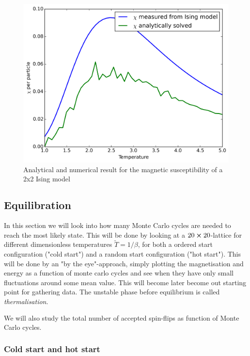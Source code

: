 \documentclass[11pt,a4paper,english,draft]{article}
\numberwithin{equation}{section}
\newcommand{\figurewidth}{.85\textwidth}
\begin{document}
\begin{figure}
\centering
\includegraphics[width=\figurewidth]{pics/pics4report/achi.png}
\caption{Analytical and numerical result for the magnetic susceptibility
of a 2x2 Ising model}
\label{fig:achi}
\end{figure}



\subsection{Equilibration}
In this section we will look into how many Monte Carlo cycles are needed 
to reach the most likely state. This will be done by looking at a 
$20 \cross 20$-lattice for different dimensionless temperatures 
$\tilde{T}=1/\beta$, for both a ordered start configuration ("cold start") 
and a random start configuration ("hot start"). 
This will be done by an "by the eye"-approach, simply plotting the 
magnetisation and energy as a function of monte carlo cycles and see 
when they have only small fluctuations around some mean value. This will 
become later become out starting point for gathering data. The unstable 
phase before equilibrium is called \emph{thermalisation}.

We will also study the total number of accepted spin-flips as function of 
Monte Carlo cycles.



\subsubsection{Cold start and hot start}
\end{document}

